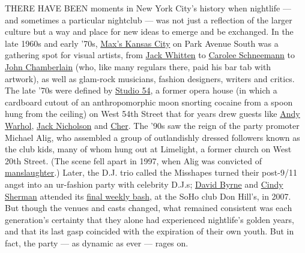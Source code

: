 THERE HAVE BEEN moments in New York City's history when nightlife ---
and sometimes a particular nightclub --- was not just a reflection of
the larger culture but a way and place for new ideas to emerge and be
exchanged. In the late 1960s and early '70s,
\href{https://www.nytimes3xbfgragh.onion/2010/09/05/arts/design/05maxs.html}{Max's
Kansas City} on Park Avenue South was a gathering spot for visual
artists, from
\href{https://www.nytimes3xbfgragh.onion/2018/01/23/obituaries/jack-whitten-artist-of-wide-ranging-curiosity-dies-at-78.html}{Jack
Whitten} to
\href{https://www.nytimes3xbfgragh.onion/2019/03/10/obituaries/carolee-schneemann-dead-at-79.html}{Carolee
Schneemann} to
\href{https://www.nytimes3xbfgragh.onion/2011/12/22/arts/design/john-chamberlain-artist-of-auto-metal-dies-at-84.html}{John
Chamberlain} (who, like many regulars there, paid his bar tab with
artwork), as well as glam-rock musicians, fashion designers, writers and
critics. The late '70s were defined by
\href{https://www.nytimes3xbfgragh.onion/2018/10/05/movies/studio-54-documentary-ian-schrager.html}{Studio
54}, a former opera house (in which a cardboard cutout of an
anthropomorphic moon snorting cocaine from a spoon hung from the
ceiling) on West 54th Street that for years drew guests like
\href{https://www.nytimes3xbfgragh.onion/topic/person/andy-warhol}{Andy
Warhol},
\href{https://www.nytimes3xbfgragh.onion/topic/person/jack-nicholson}{Jack
Nicholson} and
\href{https://www.nytimes3xbfgragh.onion/2018/09/04/arts/music/cher-abba-broadway-interview.html}{Cher}.
The '90s saw the reign of the party promoter Michael Alig, who assembled
a group of outlandishly dressed followers known as the club kids, many
of whom hung out at Limelight, a former church on West 20th Street. (The
scene fell apart in 1997, when Alig was convicted of
\href{https://www.nytimes3xbfgragh.onion/1997/09/11/nyregion/2-men-plead-guilty-in-killing-of-club-denizen.html}{manslaughter}.)
Later, the D.J. trio called the Misshapes turned their post-9/11 angst
into an ur-fashion party with celebrity D.J.s;
\href{https://www.nytimes3xbfgragh.onion/2019/11/11/t-magazine/david-byrne-binder.html}{David
Byrne} and
\href{https://www.nytimes3xbfgragh.onion/topic/person/cindy-sherman}{Cindy
Sherman} attended its
\href{https://www.nytimes3xbfgragh.onion/2007/09/10/arts/10miss.html}{final
weekly bash}, at the SoHo club Don Hill's, in 2007. But though the
venues and casts changed, what remained consistent was each generation's
certainty that they alone had experienced nightlife's golden years, and
that its last gasp coincided with the expiration of their own youth. But
in fact, the party --- as dynamic as ever --- rages on.

